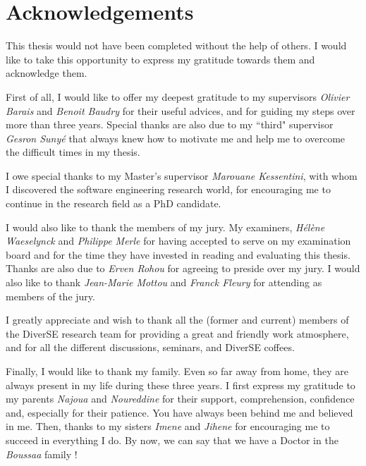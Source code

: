 \chapter*{Acknowledgements}
This thesis would not have been completed without the help of others. I would like to take this opportunity to express my gratitude towards them and acknowledge them.

First of all, I would like to offer my deepest gratitude to my supervisors \textit{Olivier Barais} and \textit{Benoit Baudry} for their useful advices, and for guiding my steps over more than three years. Special thanks are also due to my ``third" supervisor \textit{Gesron Suny\'e} that always knew how to motivate me and help me to overcome the difficult times in my thesis. 

I owe special thanks to my Master's supervisor \textit{Marouane Kessentini}, with whom I discovered the software engineering research world, for encouraging me to continue in the research field as a PhD candidate.

I would also like to thank the members of my jury. My examiners, \textit{H\'el\`ene Waeselynck} and \textit{Philippe Merle} for having accepted to serve on my examination board and for the time they have invested in reading and evaluating this thesis. Thanks are also due to \textit{Erven Rohou} for agreeing to preside over my jury. I would also like to thank \textit{Jean-Marie Mottou} and \textit{Franck Fleury} for attending as members of the jury. 

I greatly appreciate and wish to thank all the (former and current) members of the DiverSE research team for providing a great and friendly work atmosphere, and for all the different discussions, seminars, and DiverSE coffees. 

Finally, I would like to thank my family. Even so far away from home, they are always present in my life during these three years. I first express my gratitude to my parents \textit{Najoua} and \textit{Noureddine} for their support, comprehension, confidence and, especially for their patience. You have always been behind me and believed in me. Then, thanks to my sisters \textit{Imene} and \textit{Jihene} for encouraging me to succeed in everything I do. 
By now, we can say that we have a Doctor in the \textit{Boussaa} family !

